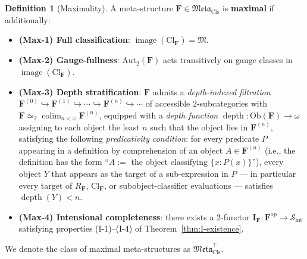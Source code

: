 \documentclass[11pt]{article}
\theoremstyle{plain}
\theoremstyle{definition}
\newtheorem{definition}[theorem]{Definition}
\newcommand{\cS}{\mathcal{S}}
\newcommand{\fM}{\mathfrak{M}}
\newcommand{\Meta}{\mathfrak{Meta}}
\newcommand{\Sint}{\cS_{\mathrm{int}}}
\newcommand{\Ob}{\mathrm{Ob}}
\newcommand{\Cl}{\mathrm{Cl}}
\newcommand{\II}{\mathbf{I}}
\DeclareMathOperator{\colim}{colim}
\DeclareMathOperator{\image}{image}
\DeclareMathOperator{\dep}{depth}
\begin{document}
\begin{definition}[Maximality]\label{def:maximality}
A meta-structure $\mathbf{F} \in \Meta_{\mathrm{Cls}}$ is \textbf{maximal} if additionally:
\begin{itemize}
\item \textbf{(Max-1) Full classification}: $\image(\Cl_{\mathbf{F}}) = \fM$.
\item \textbf{(Max-2) Gauge-fullness}: $\mathrm{Aut}_2(\mathbf{F})$ acts transitively on gauge classes in $\image(\Cl_{\mathbf{F}})$.
\item \textbf{(Max-3) Depth stratification}: $\mathbf{F}$ admits a \emph{depth-indexed filtration} $\mathbf{F}^{(0)} \hookrightarrow \mathbf{F}^{(1)} \hookrightarrow \cdots \hookrightarrow \mathbf{F}^{(n)} \hookrightarrow \cdots$ of accessible $2$-subcategories with $\mathbf{F} \simeq_2 \colim_{n < \omega} \mathbf{F}^{(n)}$, equipped with a \emph{depth function} $\dep : \Ob(\mathbf{F}) \to \omega$ assigning to each object the least $n$ such that the object lies in $\mathbf{F}^{(n)}$, satisfying the following \emph{predicativity condition}: for every predicate $P$ appearing in a definition by comprehension of an object $A \in \mathbf{F}^{(n)}$ (i.e., the definition has the form ``$A :=$ the object classifying $\{x : P(x)\}$''), every object $Y$ that appears as the target of a sub-expression in $P$ --- in particular every target of $R_\mathbf{F}$, $\Cl_\mathbf{F}$, or subobject-classifier evaluations --- satisfies $\dep(Y) < n$.
\item \textbf{(Max-4) Intensional completeness}: there exists a $2$-functor $\II_{\mathbf{F}} : \mathbf{F}^{\mathrm{op}} \to \Sint$ satisfying properties (I-1)--(I-4) of Theorem~\ref{thm:I-existence}.
\end{itemize}
We denote the class of maximal meta-structures as $\Meta_{\mathrm{Cls}}^{\top}$.
\end{definition}
\end{document}
